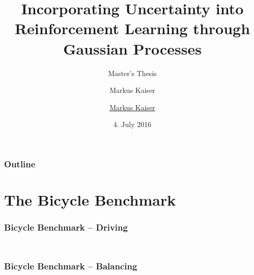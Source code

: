 





\title{Incorporating Uncertainty into Reinforcement Learning through Gaussian Processes}
\author{Markus Kaiser}
\subtitle{Master's Thesis}
\author{\href{mailto:markus.kaiser@in.tum.de}{Markus Kaiser}}
\date{4. July 2016}



\begin{frame}[plain]
    \titlepage
\end{frame}

\begin{frame}
    \frametitle{Outline}

    \tableofcontents
\end{frame}

\section{The Bicycle Benchmark}
\begin{frame}[label=bicycle_drive]
    \frametitle{Bicycle Benchmark -- Driving}

    \begin{columns}
        \begin{column}[c]{0.5\textwidth}
            \centering
            
        \end{column}
        \begin{column}[c]{0.5\textwidth}
            \centering
            \vspace{1cm}
             {
            }
        \end{column}
    \end{columns}
\end{frame}

\begin{frame}[label=bicycle_balance]
    \frametitle{Bicycle Benchmark -- Balancing}

    \vfill
    \begin{columns}
        \begin{column}{0.45\textwidth}
            \centering
            
        \end{column}
        \begin{column}{0.55\textwidth}
            \centering
             {
            }
        \end{column}
    \end{columns}
\end{frame}


